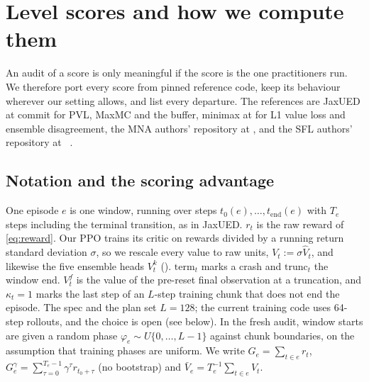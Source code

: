 \section{Level scores and how we compute them}
\label{sec:estimators}

An audit of a score is only meaningful if the score is the one practitioners run. We
therefore port every score from pinned reference code, keep its behaviour wherever our
setting allows, and list every departure. The references are JaxUED at commit
 for PVL, MaxMC and the \PLRp{} buffer, minimax at  for L1 value
loss and ensemble disagreement, the MNA authors' repository at , and the SFL
authors' repository at ~\citep{coward2024jaxued,minimax2023code,mna2026code,sfl2024code}.

\subsection{Notation and the scoring advantage}
\label{sec:est-notation}

One episode $e$ is one window, running over steps $t_0(e), \dots, t_{\text{end}}(e)$ with
$T_e$ steps including the terminal transition, as in JaxUED. $r_t$ is the raw reward of
\cref{eq:reward}. Our PPO trains its critic on rewards divided by a running return
standard deviation $\sigma$, so we rescale every value to raw units, $V_t := \sigma \hat
V_t$, and likewise the five ensemble heads $V^k_t$ (). $\mathrm{term}_t$ marks a
crash and $\mathrm{trunc}_t$ the window end. $V^f_t$ is the value of the pre-reset final
observation at a truncation, and $\kappa_t = 1$ marks the last step of an $L$-step
training chunk that does not end the episode. The spec and the plan set $L = 128$; the
current training code uses 64-step rollouts, and the choice is open (see below). In the
fresh audit, window starts are given a random phase $\varphi_e \sim U\{0, \dots, L-1\}$
against chunk boundaries, on the assumption that training phases are uniform. We write
$G_e = \sum_{t \in e} r_t$, $G^\gamma_e = \sum_{\tau=0}^{T_e-1}
\gamma^\tau r_{t_0+\tau}$ (no bootstrap) and $\bar V_e = T_e^{-1}\sum_{t\in e} V_t$.

